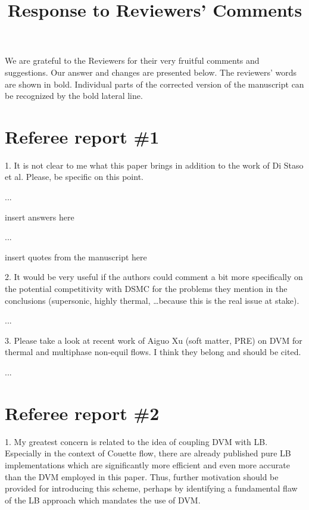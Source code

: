 \documentclass{article}
\title{Response to Reviewers' Comments}
\begin{document}
\maketitle

We are grateful to the Reviewers for their very fruitful comments and suggestions.
Our answer and changes are presented below.
The reviewers' words are shown in bold.
Individual parts of the corrected version of the manuscript
can be recognized by the bold lateral line.

\section*{Referee report \#1}

\begin{quoting}
    1. It is not clear to me what this paper brings in addition to the work of Di Staso et al.
    Please, be specific on this point.
\end{quoting}

...

insert answers here

\begin{leftbar}
    ...

    insert quotes from the manuscript here
\end{leftbar}

\begin{quoting}
    2. It would be very useful if the authors could comment a bit more specifically
    on the potential competitivity with DSMC for the problems they mention in the conclusions
    (supersonic, highly thermal, \dots because this is the real issue at stake).
\end{quoting}

...

\begin{quoting}
    3. Please take a look at recent work of Aiguo Xu (soft matter, PRE) on DVM for
    thermal and multiphase non-equil flows. I think they belong and should be cited.
\end{quoting}

...

\section*{Referee report \#2}

\begin{quoting}
    1. My greatest concern is related to the idea of coupling
    DVM with LB. Especially in the context of Couette flow,
    there are already published pure LB implementations which
    are significantly more efficient and even more accurate
    than the DVM employed in this paper. Thus, further
    motivation should be provided for introducing this scheme,
    perhaps by identifying a fundamental flaw of the LB
    approach which mandates the use of DVM.
\end{quoting}
\end{document}
